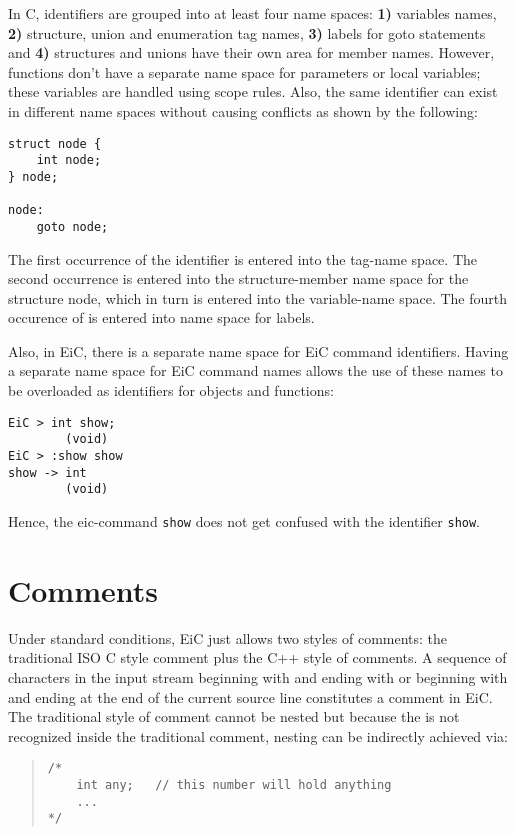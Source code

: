 In C, identifiers are grouped into at least four name spaces:
{\bf 1)} variables names, {\bf 2)} structure, union and enumeration
tag names, {\bf 3)} labels for goto statements and {\bf 4)}
structures and unions have their own area for member names.  However,
functions don't have a separate name space for parameters or local
variables; these variables are handled using scope rules. Also, the
same identifier can exist in different name spaces without causing
conflicts as shown by the following:

\begin{production}
\begin{verbatim}
struct node {
    int node;
} node;

node:
    goto node;
\end{verbatim}
\end{production}

The first occurrence of the identifier  is entered into the
tag-name space. The second occurrence is entered into the
structure-member name space for the structure node, which in turn is
entered into the variable-name space. The fourth occurence of  is
entered into name space for labels.

Also, in EiC, there is a separate name space for EiC command
identifiers. Having a separate name space for EiC command names allows
the use of these names to be overloaded as identifiers for objects and
functions:
\begin{production}
\begin{verbatim}
EiC > int show;
        (void)
EiC > :show show
show -> int 
        (void)
\end{verbatim}
\end{production}

Hence, the eic-command {\tt show} does not get confused with the identifier {\tt show}.

\section{Comments}
\label{sec:Comments}

Under standard conditions, EiC just allows two styles of comments: the
traditional ISO C style comment \T{/*\ldots*/} plus the C++ style of
comments.  A sequence of characters in the input stream beginning with
\T{/*} and ending with \T{*/} or beginning with
\T{//} and ending at the end of the current source line constitutes a
comment in EiC. The traditional style of comment \T{/*\ldots*/}
cannot be nested but because the \T{//} is not recognized inside the
traditional comment, nesting can be indirectly achieved via:
\small
\begin{quote}
\begin{verbatim}
/*
    int any;   // this number will hold anything
    ...
*/
\end{verbatim}
\end{quote}
\normalsize

